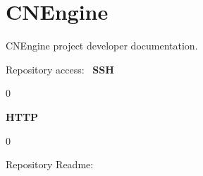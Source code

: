 \chapter{CNEngine}
\hypertarget{index}{}\label{index}
CNEngine project developer documentation.

Repository access\+:~\newline
 {\bfseries{SSH}} 
\begin{DoxyCode}{0}

\end{DoxyCode}


{\bfseries{HTTP}} 
\begin{DoxyCode}{0}

\end{DoxyCode}


Repository Readme\+:~\newline

\begin{DoxyItemize}
\item {} 
\end{DoxyItemize}
